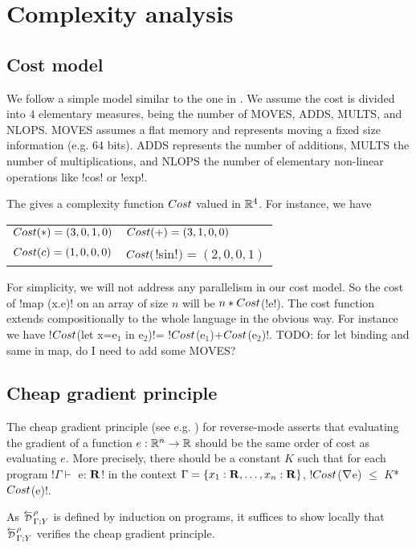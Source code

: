 \section{Complexity analysis}
\label{sec:complexity}

\subsection{Cost model}
\label{sub:costModel}

We follow a simple model similar to the one in \cite{griewank2008evaluating}.
We assume the cost is divided into $4$ elementary measures, being the number of MOVES, ADDS, MULTS, and NLOPS.
MOVES assumes a flat memory and represents moving a fixed size information  (e.g. 64 bits). 
ADDS represents the number of additions, 
MULTS the number of multiplications, 
and NLOPS the number of elementary non-linear operations like !cos! or !exp!.

The gives a complexity function $Cost$ valued in $\mathbb{R}^4$. 
For instance, we have 

\begin{tabular}{ll}
    $Cost(*)=(3,0,1,0)$ & $Cost(+)=(3,1,0,0)$\\
    $Cost(c)=(1,0,0,0)$ & $Cost($!sin!$)=(2,0,0,1)$
\end{tabular}

For simplicity, we will not address any parallelism in our cost model. 
So the cost of !map (x.e)! on an array of size $n$ will be $n*Cost$(!e!).
The cost function extends compositionally to the whole language in the obvious way.
For instance we have !$Cost$(let x=e$_1$ in e$_2$)!= !$Cost$(e$_1$)+$Cost$(e$_2$)!.
TODO: for let binding and same in map, do I need to add some MOVES?

\subsection{Cheap gradient principle}

The cheap gradient principle (see e.g. \cite{griewank2008evaluating}) for reverse-mode
asserts that evaluating the gradient of a function $e:\mathbb{R}^n\to\mathbb{R}$ 
should be the same order of cost as evaluating $e$. 
More precisely, there should be a constant $K$ such that for each program !$\Gamma \vdash$ e: $\mathbf{R}$! in the context $\Gamma=\{x_1:\mathbf{R},\ldots,x_n:\mathbf{R}\}$,
 !$Cost$($\nabla$e) $\leq$ $K$*$Cost$(e)!.

As $\directD{\rho}{\Gamma}{Y}$ is defined by induction on programs, it suffices to show locally 
that $\directD{\rho}{\Gamma}{Y}$ verifies the cheap gradient principle. 

